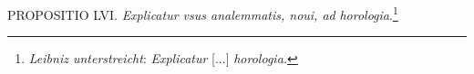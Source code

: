  \pend \vspace{2.0ex}\pstart \centering [p.~164] PROPOSITIO LVI.  \pend \vspace{1.0ex}\pstart \textit{Explicatur vsus analemmatis, noui, ad }\textit{horologia}\protect{}.\footnote{\textit{Leibniz unterstreicht}: \textit{Explicatur} [...] \textit{horologia.}}